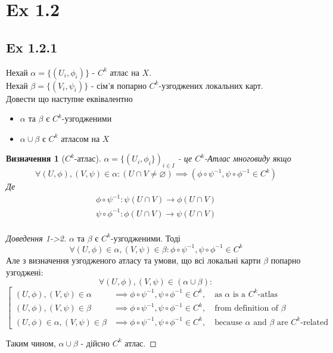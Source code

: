 \documentclass[10pt, a4paper]{article} %
\newtheorem*{definition}{Визначення}
\begin{document}
\section*{Ex 1.2}
\subsection*{Ex 1.2.1}
\begin{mdframed}
    Нехай $\alpha = \{(U_i,\phi_i)\}$ - $C^k$ атлас на $X$.\\
    Нехай $\beta = \{(V_i,\psi_i)\}$ - сім'я попарно $C^k$-узгоджених локальних карт.\\
    Довести що наступне еквівалентно 
    \begin{itemize}
        \item $\alpha$ та $\beta$ є $C^k$-узгодженими
        \item $\alpha\cup\beta$ є $C^k$ атласом на $X$
    \end{itemize}
\end{mdframed}

\begin{definition}[$C^k$-атлас]
    $\alpha = \{(U_{i}, \phi_{i}\})_{i\in I}$ - це  $C^k$-Атлас многовиду якщо
    \[\forall (U,\phi), (V,\psi) \in \alpha: (U\cap V \ne \varnothing) \implies \left(\phi\circ\psi^{-1}, \psi\circ\phi^{-1} \in C^k\right)\]
    Де 
    \begin{gather*}
        \phi\circ\psi^{-1} : \psi(U\cap V) \to \phi(U\cap V)\\
        \psi\circ\phi^{-1} : \phi(U\cap V) \to \psi(U\cap V)\\
    \end{gather*}
\end{definition}

\begin{proof}[Доведення 1->2]
    $\alpha$ та $\beta$ є $C^k$-узгодженими.
    Тоді 
    \[\forall (U,\phi) \in \alpha, (V,\psi) \in \beta: \phi \circ \psi^{-1}, \psi \circ \phi^{-1} \in C^k\]
    Але з визначення узгодженого атласу та умови, що всі локальні карти $\beta$ попарно узгоджені: 
    \[\forall (U,\phi),(V,\psi) \in (\alpha\cup\beta): \]
    \[\left[\begin{array}{ll}
        (U,\phi),(V,\psi) \in \alpha &\implies \phi\circ\psi^{-1}, \psi \circ \phi^{-1} \in C^k,\quad \text{as $\alpha$ is a $C^k$-atlas} \\
        (U,\phi),(V,\psi) \in \beta &\implies \phi\circ\psi^{-1}, \psi \circ \phi^{-1} \in C^k,\quad \text{from definition of } \beta \\
        (U,\phi) \in \alpha, (V,\psi) \in \beta & \implies \phi\circ\psi^{-1}, \psi \circ \phi^{-1} \in C^k, \quad \text{because $\alpha$ and $\beta$ are $C^k$-related} 
    \end{array}\right.\]

    Таким чином, $\alpha\cup\beta$ - дійсно $C^k$ атлас.
\end{proof}
\end{document}
